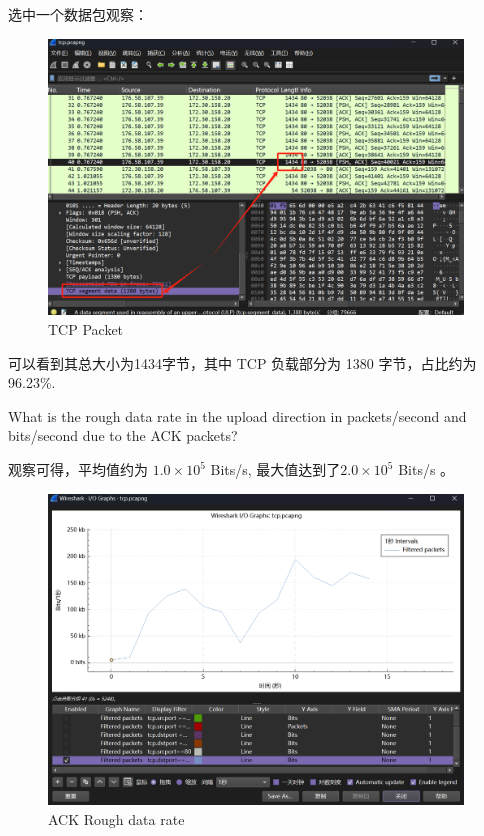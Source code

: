 \documentclass{article}
\begin{document}
	\begin{tcolorbox}[title = {Answer-2}, colback = blue!25!white, colframe = blue!75!black]
		选中一个数据包观察：
		
		\begin{figure}[H]
			\centering
			\includegraphics[width=11cm]{images/23.TCP Packet.png}
			\caption{TCP Packet}
		\end{figure}
		
		可以看到其总大小为1434字节，其中 TCP 负载部分为 1380 字节，占比约为96.23\%.
	\end{tcolorbox}
	
	\begin{tcolorbox}[title = {Question-3}, colback = red!25!white, colframe = red!75!black]
		What is the rough data rate in the upload direction in packets/second and bits/second due to the ACK packets?
	\end{tcolorbox}
	
	\begin{tcolorbox}[title = {Answer-3}, colback = blue!25!white, colframe = blue!75!black]
		观察可得，平均值约为 $ 1.0 × 10^5 $ Bits/s, 最大值达到了$ 2.0 × 10^5 $ Bits/s 。
		
		\begin{figure}[H]
			\centering
			\includegraphics[width=11cm]{images/24.ACK Rough data rate.png}
			\caption{ACK Rough data rate}
		\end{figure}
	\end{tcolorbox}
	
\end{document}

